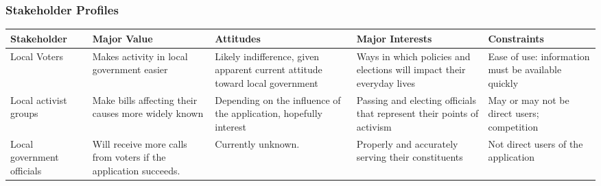 \subsubsection{Stakeholder Profiles}
\begin{adjustbox}{center,minipage=[c]{\paperwidth - 1in}}
  \begin{tabu}{lX[L]X[L]X[L]X[L]}
    \toprule
    Stakeholder & Major Value & Attitudes & Major Interests & Constraints\\
    \midrule
    Local Voters&
    Makes activity in local government easier&
    Likely indifference, given apparent current attitude toward local government&
    Ways in which policies and elections will impact their everyday lives&
    Ease of use: information must be available quickly\\

    Local activist groups&
    Make bills affecting their causes more widely known&
    Depending on the influence of the application, hopefully interest&
    Passing and electing officials that represent their points of activism&
    May or may not be direct users; competition\\

    Local government officials&
    Will receive more calls from voters if the application succeeds.&
    Currently unknown.&
    Properly and accurately serving their constituents&
    Not direct users of the application\\
    \bottomrule
  \end{tabu}
\end{adjustbox}

